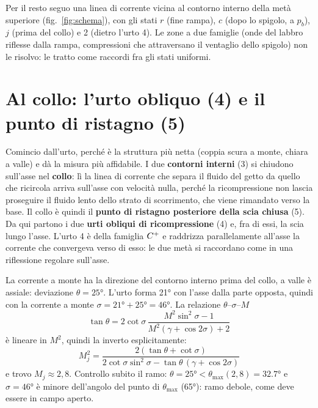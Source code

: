 
Per il resto seguo una linea di corrente vicina al contorno interno della metà superiore (fig.~\ref{fig:schema}),
con gli stati $r$ (fine rampa), $c$ (dopo lo spigolo, a $p_b$), $j$ (prima del collo) e 2 (dietro l'urto 4). Le
zone a due famiglie (onde del labbro riflesse dalla rampa, compressioni che attraversano il ventaglio dello spigolo)
non le risolvo: le tratto come raccordi fra gli stati uniformi.

\section*{Al collo: l'urto obliquo (4) e il punto di ristagno (5)}
Comincio dall'urto, perché è la struttura più netta (coppia scura a monte, chiara a valle) e dà la misura più
affidabile. I due \textbf{contorni interni} (3) si chiudono sull'asse nel \textbf{collo}: lì la linea di corrente che
separa il fluido del getto da quello che ricircola arriva sull'asse con velocità nulla, perché la ricompressione non
lascia proseguire il fluido lento dello strato di scorrimento, che viene rimandato verso la base. Il collo è quindi il
\textbf{punto di ristagno posteriore della scia chiusa} (5). Da qui partono i due \textbf{urti obliqui di
ricompressione} (4) e, fra di essi, la scia lungo l'asse. L'urto 4 è della famiglia $C^{+}$ e raddrizza parallelamente
all'asse la corrente che convergeva verso di esso: le due metà si raccordano come in una riflessione regolare
sull'asse.

La corrente a monte ha la direzione del contorno interno prima del collo, a valle è assiale: deviazione
$\theta=\ang{25}$. L'urto forma \ang{21} con l'asse dalla parte opposta, quindi con la corrente a monte
$\sigma=\ang{21}+\ang{25}=\ang{46}$. La relazione $\theta$--$\sigma$--$M$
\[
\tan\theta=2\cot\sigma\,\frac{M^2\sin^2\sigma-1}{M^2(\gamma+\cos2\sigma)+2}
\]
è lineare in $M^2$, quindi la inverto esplicitamente:
\[
M_j^2=\frac{2(\tan\theta+\cot\sigma)}{2\cot\sigma\sin^2\sigma-\tan\theta\,(\gamma+\cos2\sigma)}
\]
e trovo $M_j\approx2{,}8$. Controllo subito il ramo: $\theta=\ang{25}<\theta_{\max}(2{,}8)=\ang{32.7}$ e
$\sigma=\ang{46}$ è minore dell'angolo del punto di $\theta_{\max}$ (\ang{65}): ramo debole, come deve essere in campo
aperto.

